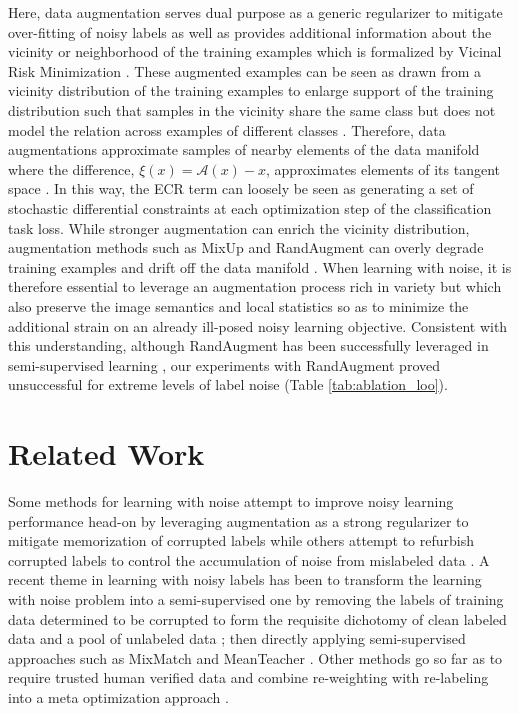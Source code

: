 \documentclass{article}
\begin{document}
Here, data augmentation serves dual purpose as a generic regularizer to mitigate over-fitting of noisy labels \cite{zhang2018mixup} as well as provides additional information about the vicinity or neighborhood of the training examples which is formalized by Vicinal Risk Minimization \cite{NIPS2000_ba9a56ce}. These augmented examples can be seen as drawn from a vicinity distribution of the training examples to enlarge support of the training distribution such that samples in the vicinity share the same class but does not model the relation across examples of different classes \cite{zhang2018mixup}.  Therefore, data augmentations approximate samples of nearby elements of the data manifold where the difference, $\xi(x)=\mathcal{A}(x)-x$, approximates elements of its tangent space \cite{athiwaratkun2018there}.  In this way, the ECR term can loosely be seen as generating a set of stochastic differential constraints at each optimization step of the classification task loss.  While stronger augmentation can enrich the vicinity distribution, augmentation methods such as MixUp \cite{zhang2018mixup} and RandAugment \cite{DBLP:conf/cvpr/CubukZSL20} can overly degrade training examples and drift off the data manifold \cite{hendrycks2020augmix}.  When learning with noise, it is therefore essential to leverage an augmentation process rich in variety but which also preserve the image semantics and local statistics so as to minimize the additional strain on an already ill-posed noisy learning objective.  Consistent with this understanding, although RandAugment has been successfully leveraged in semi-supervised learning \cite{Berthelot2020ReMixMatch:,49534,2019arXiv190412848X}, our experiments with RandAugment proved unsuccessful for extreme levels of label noise (Table \ref{tab:ablation_loo}).



\section{Related Work}

Some methods for learning with noise attempt to improve noisy learning performance head-on by leveraging augmentation as a strong regularizer to mitigate memorization of corrupted labels \cite{zhang2018mixup} while others attempt to refurbish corrupted labels to control the accumulation of noise from mislabeled data \cite{song2019}.  A recent theme in learning with noisy labels has been to transform the learning with noise problem into a semi-supervised one by removing the labels of training data determined to be corrupted to form the requisite dichotomy of clean labeled data and a pool of unlabeled data \cite{nguyen2020,li2020}; then directly applying semi-supervised approaches such as MixMatch \cite{48557} and MeanTeacher \cite{tarvainen2017}.  Other methods go so far as to require trusted human verified data and combine re-weighting with re-labeling into a meta optimization approach \cite{zhang2020}.  
\end{document}
